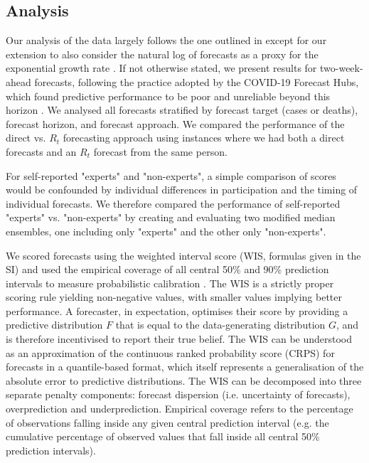 \documentclass[10pt,a4paper,twocolumn]{article}
\begin{document}
\subsection*{Analysis}
\label{sec:analysis}

Our analysis of the data largely follows the one outlined in \citet{bosseComparingHumanModelbased2022} except for our extension to also consider the natural log of forecasts as a proxy for the exponential growth rate \cite{bosseTransformationForecastsEvaluating2023}. If not otherwise stated, we present results for two-week-ahead forecasts, following the practice adopted by the COVID-19 Forecast Hubs, which found predictive performance to be poor and unreliable beyond this horizon \cite{cramerEvaluationIndividualEnsemble2021, sherrattPredictivePerformanceMultimodel2022a, bracherShorttermForecastingCOVID192021}. We analysed all forecasts stratified by forecast target (cases or deaths), forecast horizon, and forecast approach. We compared the performance of the direct vs. $R_t$ forecasting approach using instances where we had both a direct forecasts and an $R_t$ forecast from the same person. 

For self-reported "experts" and "non-experts", a simple comparison of scores would be confounded by individual differences in participation and the timing of individual forecasts. We therefore compared the performance of self-reported "experts" vs. "non-experts" by creating and evaluating two modified median ensembles, one including only "experts" and the other only "non-experts".


We scored forecasts using the weighted interval score (WIS, formulas given in the SI) %
\cite{bracherEvaluatingEpidemicForecasts2021} and used the empirical coverage of all central 50\% and 90\% prediction intervals to measure probabilistic calibration \citep{gneitingProbabilisticForecastsCalibration2007}. The WIS is a strictly proper scoring rule yielding non-negative values, with smaller values implying better performance. A forecaster, in expectation, optimises their score by providing a predictive distribution $F$ that is equal to the data-generating distribution $G$, and is therefore incentivised to report their true belief. The WIS can be understood as an approximation of the continuous ranked probability score (CRPS) for forecasts in a quantile-based format, which itself represents a generalisation of the absolute error to predictive distributions. The WIS can be decomposed into three separate penalty components: forecast dispersion (i.e. uncertainty of forecasts), overprediction and underprediction. Empirical coverage refers to the percentage of observations falling inside any given central prediction interval (e.g. the cumulative percentage of observed values that fall inside all central 50\% prediction intervals). 
\end{document}
